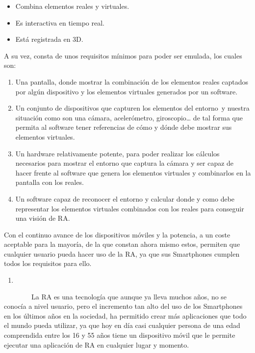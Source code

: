 \begin{itemize}
\itemsep1pt\parskip0pt
\item
  Combina elementos reales y virtuales.
\item
  Es interactiva en tiempo real.
\item
  Está registrada en 3D.
\end{itemize}

A su vez, consta de unos requisitos mínimos para poder ser emulada, los
cuales son:

\begin{enumerate}
\def\labelenumi{\arabic{enumi}.}
\itemsep1pt\parskip0pt
\item
  Una pantalla, donde mostrar la combinación de los elementos reales
  captados por algún dispositivo y los elementos virtuales generados por
  un software.
\item
  Un conjunto de dispositivos que capturen los elementos del entorno~y
  nuestra situación como son una cámara, acelerómetro,
  giroscopio\ldots{} de tal forma que permita al software tener
  referencias de cómo y dónde debe mostrar sus elementos virtuales.
\item
  Un hardware relativamente potente, para poder realizar los cálculos
  necesarios para mostrar el entorno que captura la cámara y ser capaz
  de hacer frente al software que genera los elementos virtuales y
  combinarlos en la pantalla con los reales.
\item
  Un software capaz de reconocer el entorno y calcular donde y como debe
  representar los elementos virtuales combinados con los reales para
  conseguir una visión de RA.
\end{enumerate}

Con el continuo avance de los dispositivos móviles y la potencia, a un
coste aceptable para la mayoría, de la que constan ahora mismo estos,
permiten que cualquier usuario pueda hacer uso de la RA, ya que sus
Smartphones cumplen todos los requisitos para ello.

\begin{enumerate}
\def\labelenumi{\arabic{enumi}.}
\setcounter{enumi}{1}
\item
\end{enumerate}

~~~~~~~~La RA es una tecnología que aunque ya lleva muchos años, no se
conocía a nivel usuario, pero el incremento tan alto del uso de los
Smartphones en los últimos años en la sociedad, ha permitido crear más
aplicaciones que todo el mundo pueda utilizar, ya que hoy en día casi
cualquier persona de una edad comprendida entre los 16 y 55 años tiene
un dispositivo móvil que le permite ejecutar una aplicación de RA en
cualquier lugar y momento.

